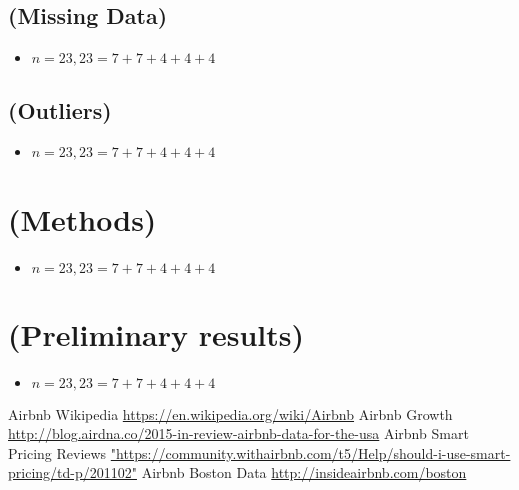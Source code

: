 \documentclass[a4paper, 12pt]{scrartcl}
\begin{document}
\subsection{(Missing Data)} 
\begin{itemize}
	\item $n=23, 23=7+7+4+4+4$
\end{itemize}

\subsection{(Outliers)} 
\begin{itemize}
	\item $n=23, 23=7+7+4+4+4$
\end{itemize}

\section{(Methods)} 
\begin{itemize}
	\item $n=23, 23=7+7+4+4+4$
\end{itemize}

\section{(Preliminary results)} 
\begin{itemize}
	\item $n=23, 23=7+7+4+4+4$
\end{itemize}


\begin{thebibliography}{9}

 Airbnb Wikipedia \url{https://en.wikipedia.org/wiki/Airbnb}
 Airbnb Growth \url{http://blog.airdna.co/2015-in-review-airbnb-data-for-the-usa}
 Airbnb Smart Pricing Reviews \url{"https://community.withairbnb.com/t5/Help/should-i-use-smart-pricing/td-p/201102"}
 Airbnb Boston Data \url{http://insideairbnb.com/boston}

\end{thebibliography}
\end{document}
